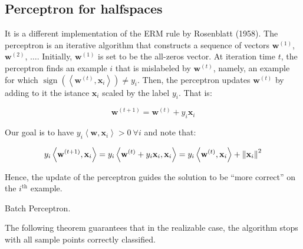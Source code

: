 \documentclass[../../main/main.tex]{subfiles}
\begin{document}
\subsection{Perceptron for halfspaces}
It is a different implementation of the ERM rule by Rosenblatt (1958). The perceptron is an iterative algorithm that constructs a sequence of vectors \( \mathbf{w}^{(1)} \), \( \mathbf{w}^{(2)} \), \( \dots \).
Initially, \( \mathbf{w}^{(1)} \) is set to be the all-zeros vector.
At iteration time \( t \), the perceptron finds an example \( i \) that is mislabeled by \( \mathbf{w}^{(t)} \), namely, an example for which \( \operatorname{sign}(\left\langle \mathbf{w}^{(t)}, \mathbf{x}_i \right\rangle) \neq y_i \).
Then, the perceptron updates \( \mathbf{w}^{(t)} \) by adding to it the istance \( \mathbf{x}_i \) scaled by the label \( y_i \). That is:

\[
    \mathbf{w}^{(t+1)} = \mathbf{w}^{(t)} + y_i \mathbf{x}_i
\]

Our goal is to have \( y_i \left\langle \mathbf{w}, \mathbf{x}_i \right\rangle > 0 \ \forall i \) and note that:

\[
    y_i \left\langle \mathbf{w}^{(t+1)}, \mathbf{x}_i \right\rangle
    =
    y_i \left\langle \mathbf{w}^{(t)} + y_i \mathbf{x}_i, \mathbf{x}_i \right\rangle
    =
    y_i \left\langle \mathbf{w}^{(t)}, \mathbf{x}_i \right\rangle + \norm{\mathbf{x}_i}^2
\]

Hence, the update of the perceptron guides the solution to be ``more correct'' on the \( i^{\text{th}} \) example.

\begin{algorithm}[H]


    \caption{Batch Perceptron.}
    \label{alg:C5_BPA}
\end{algorithm}

The following theorem guarantees that in the realizable case, the algorithm stops with all sample points correctly classified.
\end{document}
